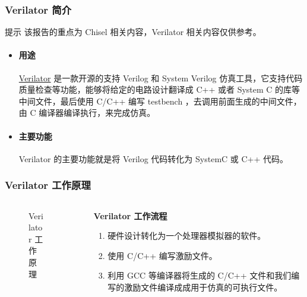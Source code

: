 \documentclass[xcolor=table,dvipsnames,svgnames,aspectratio=169]{ctexbeamer}
\begin{document}
\begin{frame}
  \frametitle{Verilator 简介}
  \begin{alertblock}{提示}
    该报告的重点为 Chisel 相关内容，Verilator 相关内容仅供参考。
  \end{alertblock}
  \begin{itemize}
    \item \paragraph{用途} \href{https://github.com/verilator/verilator}{Verilator} 是一款开源的支持 Verilog 和 System Verilog 仿真工具，它支持代码质量检查等功能，能够将给定的电路设计翻译成 C++ 或者 System C 的库等中间文件，最后使用 C/C++ 编写 testbench ，去调用前面生成的中间文件，由 C 编译器编译执行，来完成仿真。
    \item \paragraph{主要功能} Verilator 的主要功能就是将 Verilog 代码转化为 SystemC 或 C++ 代码。
  \end{itemize}
\end{frame}

\begin{frame}
  \frametitle{Verilator 工作原理}
  \begin{columns}[T]
    \begin{column}{.5\textwidth}
      \begin{figure}
        \centering
        \caption{Verilator 工作原理}
      \end{figure}
    \end{column}
    \textcolor{cprimary}{\vrule}\hfill
    \begin{column}{.5\textwidth}
      \alert{\textbf{Verilator 工作流程}}
      \stamphrule
      \begin{enumerate}
        \item 硬件设计转化为一个处理器模拟器的软件。
        \item 使用 C/C++ 编写激励文件。
        \item 利用 GCC 等编译器将生成的 C/C++ 文件和我们编写的激励文件编译成成用于仿真的可执行文件。
      \end{enumerate}
    \end{column}
  \end{columns}
\end{frame}
\end{document}
